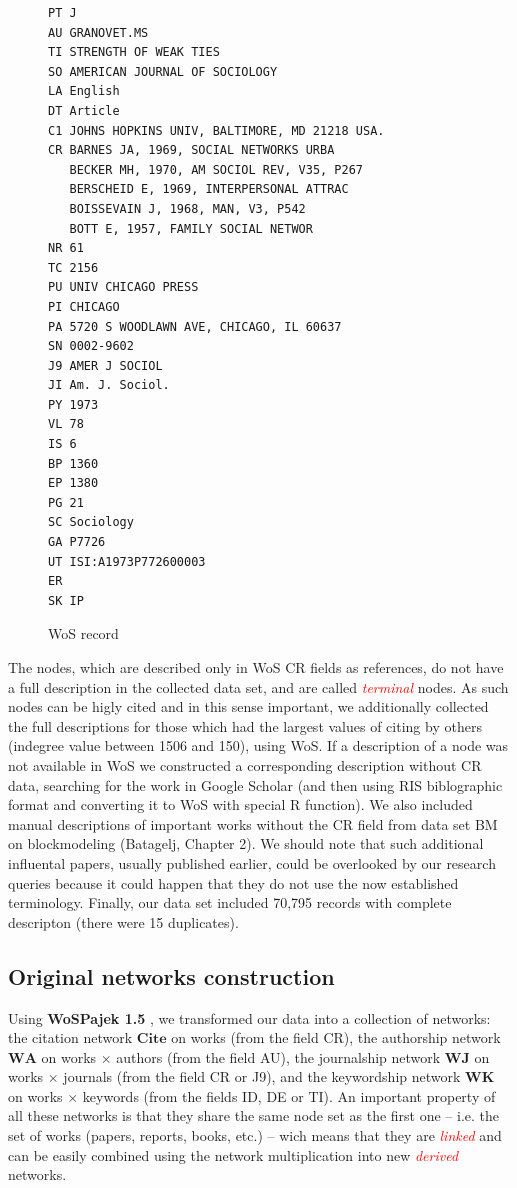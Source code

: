 \documentclass[11pt]{article} %
\newcommand{\keyw}[1]{\textcolor{red}{\emph{#1}}}
\newcommand{\WA}{\mathbf{W\!\!A}}
\newcommand{\WK}{\mathbf{W\!K}}
\newcommand{\WJ}{\mathbf{W\!J}}
\newcommand{\Ci}{\mathbf{Cite}}
\begin{document}
\begin{figure}
\renewcommand{\baselinestretch}{0.8}
\scriptsize
\begin{verbatim}
PT J
AU GRANOVET.MS
TI STRENGTH OF WEAK TIES
SO AMERICAN JOURNAL OF SOCIOLOGY
LA English
DT Article
C1 JOHNS HOPKINS UNIV, BALTIMORE, MD 21218 USA.
CR BARNES JA, 1969, SOCIAL NETWORKS URBA
   BECKER MH, 1970, AM SOCIOL REV, V35, P267
   BERSCHEID E, 1969, INTERPERSONAL ATTRAC
   BOISSEVAIN J, 1968, MAN, V3, P542
   BOTT E, 1957, FAMILY SOCIAL NETWOR
NR 61
TC 2156
PU UNIV CHICAGO PRESS
PI CHICAGO
PA 5720 S WOODLAWN AVE, CHICAGO, IL 60637
SN 0002-9602
J9 AMER J SOCIOL
JI Am. J. Sociol.
PY 1973
VL 78
IS 6
BP 1360
EP 1380
PG 21
SC Sociology
GA P7726
UT ISI:A1973P772600003
ER
SK IP
\end{verbatim}
\caption{WoS record}\label{wos}
\end{figure}

The nodes, which are described only in WoS CR fields as references, do not have a full description in the collected data set, and are called \keyw{terminal} nodes. As such nodes can be higly cited and in this sense important, we additionally collected the full descriptions for those which had the  largest values of citing by others (indegree value between 1506 and 150), using WoS. If a description of a node was not available in WoS we constructed a corresponding description without CR data, searching for the work in Google Scholar (and then using RIS biblographic format and converting it to WoS with special R function). We also included manual descriptions of important works without the CR field from data set BM on blockmodeling (Batagelj, Chapter 2). We should note that such additional influental papers, usually published earlier, could be overlooked by our research queries because it could happen that they do not use the now established terminology. Finally, our data set included 70,795 records with complete descripton (there were 15 duplicates).  \medskip

\subsection{Original networks construction}

Using \textbf{WoSPajek 1.5} \citep{wos2pajek}, we transformed our data into a collection of networks: the citation network $\Ci$ on works (from the field CR), the authorship network $\WA$ on works $\times$ authors  (from the field AU),  the journalship network $\WJ$ on  works $\times$ journals  (from the field CR or J9), and the keywordship network $\WK$ on works  $\times$ keywords (from the fields ID, DE or TI). An important property of all these networks is that they share the same node set as the first one -- i.e. the set of works (papers, reports, books, etc.) -- wich means that they are \keyw{linked} and can be easily combined using the network multiplication into new \keyw{derived}  networks. \medskip
\end{document}
